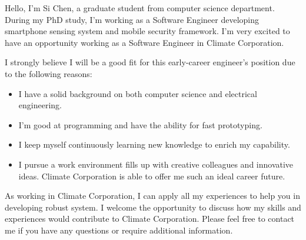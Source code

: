 \documentclass[11pt, a4paper]{awesome-cv}
\begin{document}
\makecvheader

\makelettertitle

\begin{cvletter}
Hello, I'm Si Chen, a graduate student from computer science department. During my PhD study, I'm working as a Software Engineer developing smartphone sensing system and mobile security framework. I'm very excited to have an opportunity working as a Software Engineer in Climate Corporation.



I strongly believe I will be a good fit for this early-career engineer’s position due to the following reasons:
\begin{itemize}
\item I have a solid background on both computer science and electrical engineering.
\item I'm good at programming and have the ability for fast prototyping. 
\item I keep myself continuously learning new knowledge to enrich my capability.
\item I pursue a work environment fills up with creative colleagues and innovative ideas. Climate Corporation is able to offer me such an ideal career future. 
\end{itemize}
As working in Climate Corporation, I can apply all my experiences to help you in developing robust system. I welcome the opportunity to discuss how my skills and experiences would contribute to Climate Corporation. Please feel free to contact me if you have any questions or require additional information.

\end{cvletter}

\makeletterclosing
\end{document}
